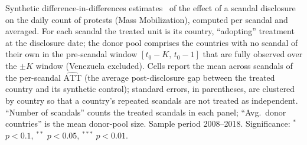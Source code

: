 \documentclass[11pt]{article}
\begin{document}
\begin{table}[htb!]
    \caption{Synthetic difference-in-differences: per-scandal stacked estimates.}
    \label{tab:sup_sdid}
    \begin{center}
        \scriptsize{}
    \end{center}
    \footnotesize{Synthetic difference-in-differences estimates~\citep{arkhangelsky2021synthetic} of the effect of a scandal disclosure on the daily count of protests (Mass Mobilization), computed per scandal and averaged. For each scandal the treated unit is its country, ``adopting'' treatment at the disclosure date; the donor pool comprises the countries with no scandal of their own in the pre-scandal window $[t_0-K,\,t_0-1]$ that are fully observed over the $\pm K$ window (Venezuela excluded). Cells report the mean across scandals of the per-scandal $\widehat{\text{ATT}}$ (the average post-disclosure gap between the treated country and its synthetic control); standard errors, in parentheses, are clustered by country so that a country's repeated scandals are not treated as independent. ``Number of scandals'' counts the treated scandals in each panel; ``Avg.\ donor countries'' is the mean donor-pool size. Sample period 2008--2018. Significance: $^{*}$ $p<0.1$, $^{**}$ $p<0.05$, $^{***}$ $p<0.01$.}
\end{table}
\end{document}
